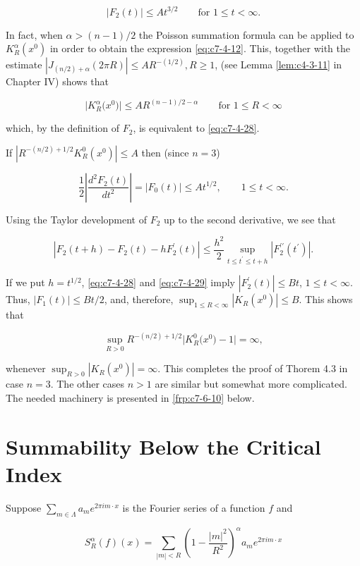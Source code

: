 \begin{equation}\label{eq:c7-4-28}
|F_{2}(t)|\leq A t^{3/2}\qquad\text{for }1\leq t<\infty.
\end{equation}

In fact, when $\alpha > (n-1)/2$ the Poisson summation formula can be applied to $K_R^\alpha(x^0)$ in order to obtain the expression \eqref{eq:c7-4-12}. This, together with the estimate $|J_{(n/2)+\alpha}(2\pi R)| \leq AR^{-(1/2)}, R \geq 1$, (see Lemma \ref{lem:c4-3-11} in Chapter IV) shows that

\[
\big|K_{R}^{\alpha}\big(x^{0}\big)\big|\leq A R^{(n-1)/2-\alpha}\qquad\text{for }1\leq R<\infty
\]

which, by the definition of $F_{2}$, is equivalent to \eqref{eq:c7-4-28}.

If $|R^{-(n/2)+1/2}K_{R}^{0}(x^{0})| \leq A$ then (since $n = 3$)

\begin{equation}\label{eq:c7-4-29}
\frac{1}{2}\left|\frac{d^{2}F_{2}(t)}{d t^{2}}\right|=|F_{0}(t)|\leq A t^{1/2},\qquad1\leq t<\infty.
\end{equation}

Using the Taylor development of $F_{2}$ up to the second derivative, we see that

\[
|F_{2}(t+h)-F_{2}(t)-h F_{2}^{\prime}(t)|\leq\frac{h^{2}}{2}\sup_{t\leq t^{\prime}\leq t+h}|F_{2}^{\prime \prime}(t^{\prime})|.
\]

If we put $h = t^{1/2}$, \eqref{eq:c7-4-28} and \eqref{eq:c7-4-29} imply $|F_{2}^{\prime}(t)| \leq Bt$, $1 \leq t < \infty$. Thus, $|F_{1}(t)| \leq Bt/2$, and, therefore, $\sup_{1 \leq R < \infty} |K_{R}(x^{0})| \leq B$. This shows that

\[
\sup_{R>0}R^{-(n/2)+1/2}\big|K^{0}_{R}\big(x^{0}\big)-1\big|=\infty,
\]

whenever $\sup_{R>0}|K_{R}(x^{0})|=\infty$. This completes the proof of Thorem 4.3 in case $n=3$. The other cases $n>1$ are similar but somewhat more complicated. The needed machinery is presented in \eqref{frp:c7-6-10} below.

\section{Summability Below the Critical Index}

Suppose $\sum_{m \in \Lambda} a_m e^{2\pi im \cdot x}$ is the Fourier series of a function $f$ and

\[
S_{R}^{\alpha}(f)(x)=\sum_{|m|<R}\left(1-\frac{|m|^{2}}{R^{2}}\right)^{\alpha}a_{m}e^{2\pi i m\cdot x}
\]

